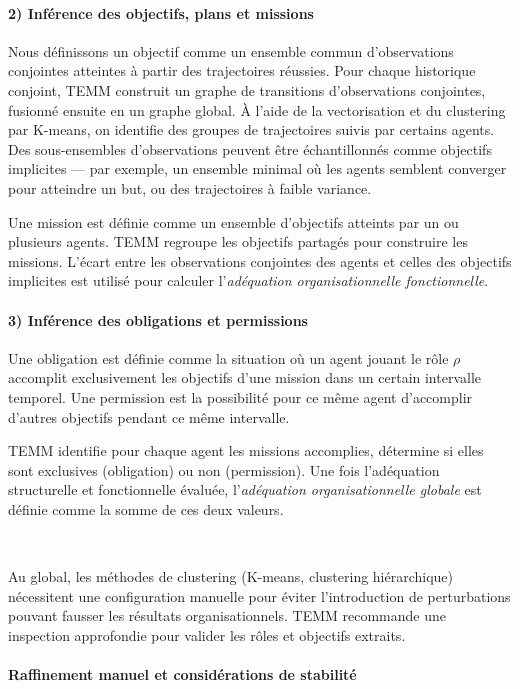 \paragraph{2) Inférence des objectifs, plans et missions}

Nous définissons un objectif comme un ensemble commun d'observations conjointes atteintes à partir des trajectoires réussies.
Pour chaque historique conjoint, TEMM construit un graphe de transitions d'observations conjointes, fusionné ensuite en un graphe global. À l'aide de la vectorisation et du clustering par K-means, on identifie des groupes de trajectoires suivis par certains agents. Des sous-ensembles d'observations peuvent être échantillonnés comme objectifs implicites — par exemple, un ensemble minimal où les agents semblent converger pour atteindre un but, ou des trajectoires à faible variance.

Une mission est définie comme un ensemble d'objectifs atteints par un ou plusieurs agents. TEMM regroupe les objectifs partagés pour construire les missions.
L'écart entre les observations conjointes des agents et celles des objectifs implicites est utilisé pour calculer l'\textit{adéquation organisationnelle fonctionnelle}.

\paragraph{3) Inférence des obligations et permissions}

Une obligation est définie comme la situation où un agent jouant le rôle $\rho$ accomplit exclusivement les objectifs d'une mission dans un certain intervalle temporel. Une permission est la possibilité pour ce même agent d'accomplir d'autres objectifs pendant ce même intervalle.

TEMM identifie pour chaque agent les missions accomplies, détermine si elles sont exclusives (obligation) ou non (permission).
Une fois l'adéquation structurelle et fonctionnelle évaluée, l'\textit{adéquation organisationnelle globale} est définie comme la somme de ces deux valeurs.

\

Au global, les méthodes de clustering (K-means, clustering hiérarchique) nécessitent une configuration manuelle pour éviter l'introduction de perturbations pouvant fausser les résultats organisationnels. TEMM recommande une inspection approfondie pour valider les rôles et objectifs extraits.

\paragraph{Raffinement manuel et considérations de stabilité}


